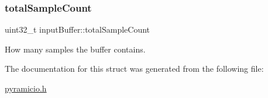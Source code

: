 \subsubsection{\texorpdfstring{total\+Sample\+Count}{totalSampleCount}}
{\footnotesize\ttfamily uint32\+\_\+t input\+Buffer\+::total\+Sample\+Count}



How many samples the buffer contains. 



The documentation for this struct was generated from the following file\+:\begin{DoxyCompactItemize}
\item 
\hyperlink{pyramicio_8h}{pyramicio.\+h}\end{DoxyCompactItemize}
